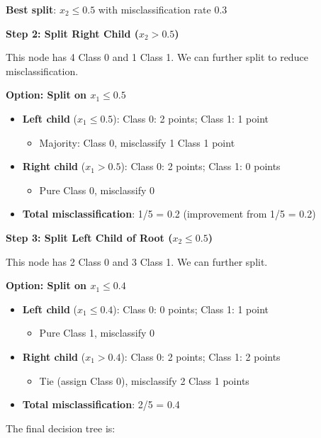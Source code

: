 \documentclass[11pt]{article}
\begin{document}
\textbf{Best split}: $x_2 \leq 0.5$ with misclassification rate 0.3

\textbf{Step 2: Split Right Child ($x_2 > 0.5$)}

This node has 4 Class 0 and 1 Class 1. We can further split to reduce misclassification.

\textbf{Option: Split on $x_1 \leq 0.5$}
\begin{itemize}
\item \textbf{Left child} ($x_1 \leq 0.5$): Class 0: 2 points; Class 1: 1 point
  \begin{itemize}
  \item Majority: Class 0, misclassify 1 Class 1 point
  \end{itemize}
\item \textbf{Right child} ($x_1 > 0.5$): Class 0: 2 points; Class 1: 0 points
  \begin{itemize}
  \item Pure Class 0, misclassify 0
  \end{itemize}
\item \textbf{Total misclassification}: 1/5 = 0.2 (improvement from 1/5 = 0.2)
\end{itemize}

\textbf{Step 3: Split Left Child of Root ($x_2 \leq 0.5$)}

This node has 2 Class 0 and 3 Class 1. We can further split.

\textbf{Option: Split on $x_1 \leq 0.4$}
\begin{itemize}
\item \textbf{Left child} ($x_1 \leq 0.4$): Class 0: 0 points; Class 1: 1 point
  \begin{itemize}
  \item Pure Class 1, misclassify 0
  \end{itemize}
\item \textbf{Right child} ($x_1 > 0.4$): Class 0: 2 points; Class 1: 2 points
  \begin{itemize}
  \item Tie (assign Class 0), misclassify 2 Class 1 points
  \end{itemize}
\item \textbf{Total misclassification}: 2/5 = 0.4
\end{itemize}

The final decision tree is:
\end{document}
